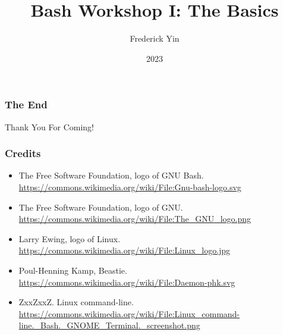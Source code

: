 \documentclass{beamer}
\title{Bash Workshop I: The Basics}
\author{Frederick Yin}
\institute{JITech}
\date{2023}
\begin{document}
\frame{\titlepage}






\begin{frame}
\frametitle{The End}
\vspace{1cm}
\centering \Huge {Thank You For Coming!}
\end{frame}

\begin{frame}
\frametitle{Credits}
\begin{itemize}
    \item The Free Software Foundation, logo of GNU Bash.
        \url{https://commons.wikimedia.org/wiki/File:Gnu-bash-logo.svg}
    \item The Free Software Foundation, logo of GNU.
        \url{https://commons.wikimedia.org/wiki/File:The_GNU_logo.png}
    \item Larry Ewing, logo of Linux.
        \url{https://commons.wikimedia.org/wiki/File:Linux_logo.jpg}
    \item Poul-Henning Kamp, Beastie.
        \url{https://commons.wikimedia.org/wiki/File:Daemon-phk.svg}
    \item ZxxZxxZ. Linux command-line.
        \url{https://commons.wikimedia.org/wiki/File:Linux_command-line._Bash._GNOME_Terminal._screenshot.png}
\end{itemize}
\end{frame}
\end{document}
